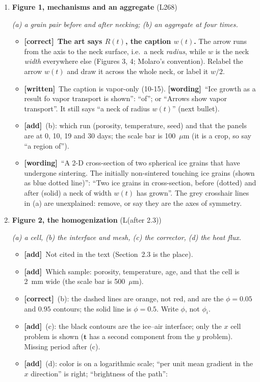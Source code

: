 \documentclass[11pt]{article}
\newcommand{\Have}{\textcolor{have}{\textbf{[written]}}\ }
\newcommand{\Pg}[3]{\item \textbf{#1} {\small(#2)}\par\textit{#3}}
\newcommand{\tC}{\textcolor{miss}{\textbf{[correct]}}\ }
\newcommand{\tG}{\textcolor{stale}{\textbf{[wording]}}\ }
\newcommand{\tA}{\textcolor{have}{\textbf{[add]}}\ }
\begin{document}
\begin{enumerate}
\Pg{Figure 1, mechanisms and an aggregate}{L268}{(a) a grain pair before and after necking; (b) an aggregate at four times.}
  \begin{itemize}
  \item \tC \textbf{The art says $R(t)$, the caption $w(t)$.} The arrow runs
    from the axis to the neck surface, i.e.\ a neck \emph{radius}, while $w$
    is the neck \emph{width} everywhere else (Figures 3, 4; Molaro's
    convention). Relabel the arrow $w(t)$ and draw it across the whole neck,
    or label it $w/2$.
  \item \Have The caption is vapor-only (10-15). \tG ``Ice growth as a
    result fo vapor transport is shown'': ``of''; or ``Arrows show vapor
    transport''. It still says ``a neck of radius $w(t)$'' (next bullet).
  \item \tA (b): which run (porosity, temperature, seed) and that the panels
    are at 0, 10, 19 and 30 days; the scale bar is 100~$\mu$m (it is a
    crop, so say ``a region of'').
  \item \tG ``A 2-D cross-section of two spherical ice grains that have
    undergone sintering. The initially non-sintered touching ice grains
    (shown as blue dotted line)'': ``Two ice grains in cross-section, before
    (dotted) and after (solid) a neck of width $w(t)$ has grown''. The grey
    crosshair lines in (a) are unexplained: remove, or say they are the axes
    of symmetry.
  \end{itemize}
\Pg{Figure 2, the homogenization}{L(after 2.3)}{(a) a cell, (b) the interface and mesh, (c) the corrector, (d) the heat flux.}
  \begin{itemize}
  \item \tA Not cited in the text (Section~2.3 is the place).
  \item \tA Which sample: porosity, temperature, age, and that the cell is
    2~mm wide (the scale bar is 500~$\mu$m).
  \item \tC (b): the dashed lines are orange, not red, and are the
    $\phi = 0.05$ and $0.95$ contours; the solid line is $\phi = 0.5$.
    Write $\phi$, not $\phi_i$.
  \item \tA (c): the black contours are the ice--air interface; only the
    $x$ cell problem is shown ($\mathbf{t}$ has a second component from the
    $y$ problem). Missing period after (c).
  \item \tA (d): color is on a logarithmic scale; ``per unit mean gradient
    in the $x$ direction'' is right; ``brightness of the path'':

\end{itemize}
\end{enumerate}
\end{document}
